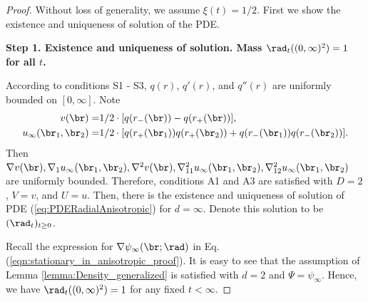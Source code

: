 \documentclass[11pt]{article}
\begin{document}
\begin{proof} Without loss of generality, we assume $\xi(t) = 1/2$. First we show the existence and uniqueness of solution of the PDE. 

\vskip 0.2cm
\noindent
{\bf Step 1. Existence and uniqueness of solution. Mass $\rad_t((0, \infty)^2) = 1$ for all $t$. }

According to conditions {\sf S1} - {\sf S3}, $q(r)$, $q'(r)$, and $q''(r)$ are uniformly bounded on $[0, \infty]$. Note 
\[
\begin{aligned}
v(\br) =& 1/2 \cdot [q(r_-(\br)) - q(r_+(\br))],\\
u_\infty(\br_1, \br_2) =& 1/2 \cdot [q(r_+(\br_1)) q(r_+(\br_2)) + q(r_-(\br_1)) q(r_-(\br_2))].\\
\end{aligned}
\]
Then $\nabla v(\br), \nabla_1 u_\infty(\br_1, \br_2), \nabla^2 v(\br), \nabla_{11}^2 u_\infty(\br_1, \br_2), \nabla_{12}^2 u_\infty(\br_1, \br_2)$ are uniformly bounded. Therefore, conditions {\sf A1} and {\sf A3} are satisfied with $D = 2$, $V = v$, and $U = u$. Then, there is the existence and uniqueness of solution of PDE (\ref{eq:PDERadialAnisotropic}) for $d = \infty$. Denote this solution to be $(\rad_t)_{t \ge 0}$. 

Recall the expression for $\nabla \psi_\infty(\br; \rad)$ in Eq. (\ref{eqn:stationary_in_anisotropic_proof}). It is easy to see that the assumption of Lemma \ref{lemma:Density_generalized} is satisfied with $d = 2$ and $\Psi = \psi_\infty$. Hence, we have $\rad_t((0, \infty)^2) = 1$ for any fixed $t < \infty$. 


\end{proof}
\end{document}
